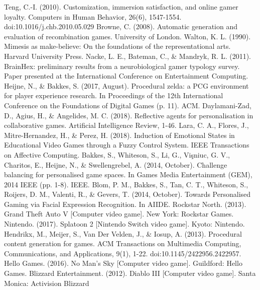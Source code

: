 \documentclass[a4paper,11pt]{article}
\begin{document}
\begin{thebibliography}{99}
        Teng, C.-I. (2010). Customization, immersion satisfaction, and online gamer loyalty. Computers in Human Behavior, 26(6), 1547-1554. doi:10.1016/j.chb.2010.05.029        
        Browne, C. (2008). Automatic generation and evaluation of recombination games. University of London.
        Walton, K. L. (1990). Mimesis as make-believe: On the foundations of the representational arts. Harvard University Press.
        Nacke, L. E., Bateman, C., \& Mandryk, R. L. (2011). BrainHex: preliminary results from a neurobiological gamer typology survey. Paper presented at the International Conference on Entertainment Computing.
        Heijne, N., \& Bakkes, S. (2017, August). Procedural zelda: a PCG environment for player experience research. In Proceedings of the 12th International Conference on the Foundations of Digital Games (p. 11). ACM.
        Daylamani-Zad, D., Agius, H., \& Angelides, M. C. (2018). Reflective agents for personalisation in collaborative games. Artificial Intelligence Review, 1-46.  
        Lara, C. A., Flores, J., Mitre-Hernandez, H., \& Perez, H. (2018). Induction of Emotional States in Educational Video Games through a Fuzzy Control System. IEEE Transactions on Affective Computing.
        Bakkes, S., Whiteson, S., Li, G., Vişniuc, G. V., Charitos, E., Heijne, N., \& Swellengrebel, A. (2014, October). Challenge balancing for personalised game spaces. In Games Media Entertainment (GEM), 2014 IEEE (pp. 1-8). IEEE.
        Blom, P. M., Bakkes, S., Tan, C. T., Whiteson, S., Roijers, D. M., Valenti, R., \& Gevers, T. (2014, October). Towards Personalised Gaming via Facial Expression Recognition. In AIIDE.
        Rockstar North. (2013). Grand Theft Auto V [Computer video game]. New York: Rockstar Games.
        Nintendo. (2017). Splatoon 2 [Nintendo Switch video game]. Kyoto: Nintendo.
        Hendrikx, M., Meijer, S., Van Der Velden, J., \& Iosup, A. (2013). Procedural content generation for games. ACM Transactions on Multimedia Computing, Communications, and Applications, 9(1), 1-22. doi:10.1145/2422956.2422957.
        Hello Games. (2016). No Man's Sky [Computer video game]. Guildford: Hello Games.
        Blizzard Entertainment. (2012). Diablo III [Computer video game]. Santa Monica: Activision Blizzard

\end{thebibliography}
\end{document}
